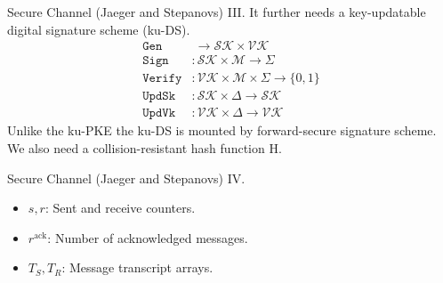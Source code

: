 \documentclass{beamer}
\renewcommand{\t}{\text}
\begin{document}
\begin{frame}{Secure Channel (Jaeger and Stepanovs) III.}
  It further needs a key-updatable digital signature scheme (ku-DS).
  \begin{align*}
    \texttt{Gen} & \  \rightarrow \mathcal{SK} \times \mathcal{VK} \\
    \texttt{Sign} & : \mathcal{SK} \times \mathcal{M} \rightarrow \Sigma \\
    \texttt{Verify} & : \mathcal{VK} \times \mathcal{M} \times \Sigma \rightarrow \{0,1\} \\
    \texttt{UpdSk} & : \mathcal{SK} \times \Delta \rightarrow \mathcal{SK} \\
    \texttt{UpdVk} & : \mathcal{VK} \times \Delta \rightarrow \mathcal{VK}
  \end{align*}
  Unlike the ku-PKE the ku-DS is mounted by forward-secure signature scheme.
  We also need a collision-resistant hash function H.
\end{frame}

\begin{frame}{Secure Channel (Jaeger and Stepanovs) IV.}
  \scriptsize
  \begin{minipage}[h]{0.65\textwidth}
      \begin{figure}[h]
        \centering
        \setlength{\fboxsep}{10pt}
        \scalebox{0.7}{%
        \fbox{%
          
        }
      }
    \end{figure}
    \end{minipage}
  \begin{minipage}[h]{0.34\textwidth}
      \begin{itemize}
      \item $s, r$: Sent and receive counters.
      \item $r^\t{ack}$: Number of acknowledged messages.
      \item $T_S,T_R$: Message transcript arrays.
      \end{itemize}
    \end{minipage}
\end{frame}
\end{document}
